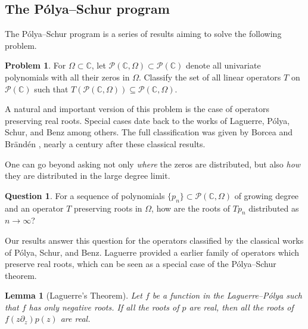 \documentclass[reqno]{amsart}
\newcommand{\1}{\mathbf{1}}
\newcommand{\C}{\mathbb{C}}
\theoremstyle{plain}
\newtheorem{lemma}[theorem]{Lemma}
\theoremstyle{definition}
\newtheorem{problem}[theorem]{Problem}
\newtheorem{question}[theorem]{Question}
\theoremstyle{remark}
\numberwithin{equation}{section}
\begin{document}
\subsection{The P\'olya--Schur program}\label{sec:polyaschur}  The P\'olya--Schur program \cite{Borcea-Branden2009Ann,Borcea-Branden2009Inv,Craven-Csordas1994,Benz1935,Polya1913,Schur--Polya1914,Laguerre1883} is a series of results aiming to solve the following problem. \begin{problem}\label{prob:PS prob}
	For $\Omega\subset\C$, let $\mathcal{P}(\C,\Omega)\subset\mathcal{P}(\C)$ denote all univariate polynomials with all their zeros in $\Omega$. Classify the set of all linear operators $T$ on $\mathcal{P}(\C)$ such that $T(\mathcal{P}(\C,\Omega))\subseteq \mathcal{P}(\C,\Omega)$. 
\end{problem} A natural and important version of this problem is the case of operators preserving real roots. Special cases date back to the works of Laguerre, P\'olya, Schur, and Benz  \cite{Benz1935,Polya1913,Schur--Polya1914,Laguerre1883} among others. The full classification was given by Borcea and Br\"and\'en \cite{Borcea-Branden2009Ann}, nearly a century after these classical results.

One can go beyond asking not only \emph{where} the zeros are distributed, but also \emph{how} they are distributed in the large degree limit. 
\begin{question}\label{ques:how are roots distributed}
	For a sequence of polynomials $\{p_n\}\subset\mathcal{P}(\C,\Omega)$ of growing degree and an operator $T$ preserving roots in $\Omega$, how are the roots of $Tp_n$ distributed as $n\rightarrow\infty$?
\end{question}   Our results answer this question for the operators classified by the classical works of P\'olya, Schur, and Benz.  
Laguerre provided a earlier family of operators which preserve real roots, which can be seen as a special case of the P\'olya--Schur theorem.
 \begin{lemma}[Laguerre's Theorem]\label{lem:Lag theorem}
	Let $f$ be a function in the Laguerre--P\'olya such that $f$ has only negative roots. If all the roots of $p$ are real, then all the roots of $f(z\partial_{z})p(z)$ are real. 
\end{lemma}
\end{document}
